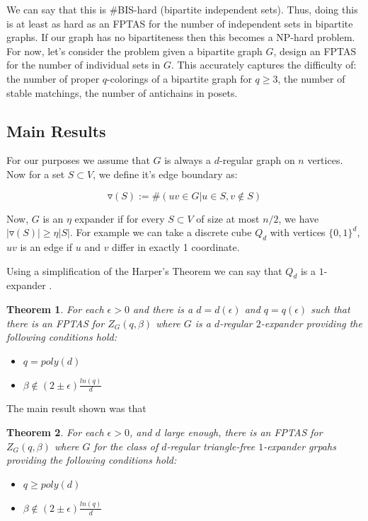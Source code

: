 \documentclass{article}
\newtheorem{theorem}{Theorem}
\begin{document}
\noindent We can say that this is \#BIS-hard (bipartite independent sets). Thus, doing this is at least as hard as an FPTAS for the number of independent sets in bipartite graphs. If our graph has no bipartiteness then this becomes a NP-hard problem.\\

\noindent For now, let's consider the problem given a bipartite graph $G$, design an FPTAS for the number of individual sets in $G$. This accurately captures the difficulty of: the number of proper $q$-colorings of a bipartite graph for $q \geq 3$, the number of stable matchings, the number of antichains in posets.

\subsection{Main Results}

\noindent For our purposes we assume that $G$ is always a $d$-regular graph on $n$ vertices. Now for a set $S \subset V$, we define it's edge boundary as:

\begin{equation*}
    \triangledown(S) := \# (uv \in G | u \in S, v \notin S)
\end{equation*}

\noindent Now, $G$ is an $\eta$ expander if for every $S \subset V$ of size at most $n/2$, we have $|\triangledown(S)| \geq \eta|S|$. For example we can take a discrete cube $Q_d$ with vertices $\{0,1\}^d$, $uv$ is an edge if $u$ and $v$ differ in exactly 1 coordinate.

\noindent Using a simplification of the Harper's Theorem we can say that $Q_d$ is a $1$-expander \cite{frankl1981short}.\\

\begin{theorem}
For each $\epsilon > 0$ and there is a $d=d(\epsilon)$ and $q = q(\epsilon)$ such that there is an FPTAS for $Z_G(q, \beta)$ where $G$ is a $d$-regular $2$-expander providing the following conditions hold:

\begin{itemize}
    \item $q=poly(d)$
    \item $\beta \notin (2 \pm \epsilon)\frac{ln(q)}{d}$
\end{itemize}
\end{theorem}

\noindent The main result shown was that 

\begin{theorem}
For each $\epsilon > 0$, and $d$ large enough, there is an FPTAS for $Z_G(q, \beta)$ where $G$ for the class of $d$-regular triangle-free $1$-expander grpahs providing the following conditions hold:

\begin{itemize}
    \item $q \geq poly(d)$
    \item $\beta \notin (2 \pm \epsilon)\frac{ln(q)}{d}$
\end{itemize}
\end{theorem}
\end{document}
